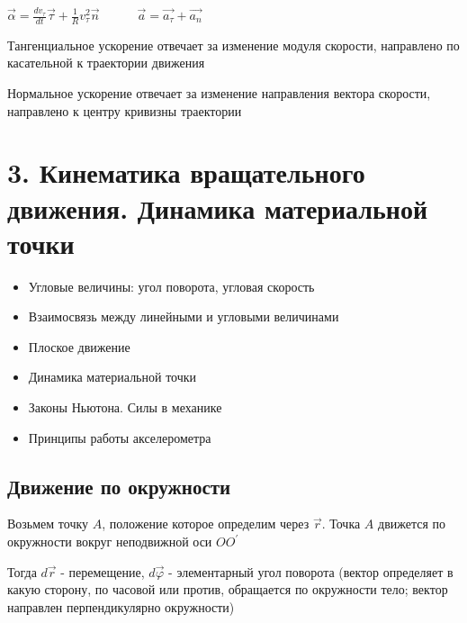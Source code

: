 \documentclass[12pt]{article}
\begin{document}
    $\vec{\alpha} = \frac{dv_\tau}{dt} \vec{\tau} + \frac{1}{R} v_\tau^2 \vec{n} \quad\quad\quad \vec{a} = \vec{a_\tau} + \vec{a_n}$

    Тангенциальное ускорение отвечает за изменение модуля скорости, направлено по касательной к траектории движения

    Нормальное ускорение отвечает за изменение направления вектора скорости, направлено к центру кривизны траектории


    \section{3.
    Кинематика вращательного движения.
    Динамика материальной точки}

    \begin{tcolorbox}[colframe=blue!25, colback=blue!10, title=\textbf{План лекции}]

        \footnotesize
        \begin{itemize}
            \item Угловые величины: угол поворота, угловая скорость

            \item Взаимосвязь между линейными и угловыми величинами

            \item Плоское движение

            \item Динамика материальной точки

            \item Законы Ньютона. Силы в механике

            \item Принципы работы акселерометра
        \end{itemize}
    \end{tcolorbox}

    \subsection{Движение по окружности}

    Возьмем точку $A$, положение которое определим через $\vec{r}$. Точка $A$ движется по окружности вокруг неподвижной оси $OO^\prime$

    Тогда $d\vec{r}$ - перемещение, $d\vec{\varphi}$ - элементарный угол поворота (вектор определяет в какую сторону, по часовой или против,
    обращается по окружности тело; вектор направлен перпендикулярно окружности)
\end{document}
